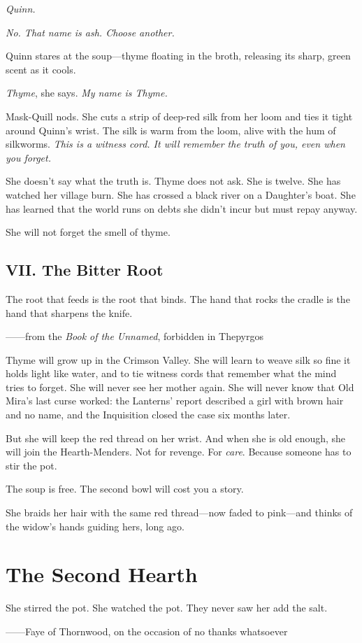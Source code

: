 \documentclass[11pt]{book}
\begin{document}
\textit{Quinn.}

\textit{No. That name is ash. Choose another.}

Quinn stares at the soup---thyme floating in the broth, releasing its sharp, green scent as it cools.

\textit{Thyme}, she says. \textit{My name is Thyme.}

Mask-Quill nods. She cuts a strip of deep-red silk from her loom and ties it tight around Quinn's wrist. The silk is warm from the loom, alive with the hum of silkworms. \textit{This is a witness cord. It will remember the truth of you, even when you forget.}

She doesn't say what the truth is. Thyme does not ask. She is twelve. She has watched her village burn. She has crossed a black river on a Daughter's boat. She has learned that the world runs on debts she didn't incur but must repay anyway.

She will not forget the smell of thyme.

\section*{VII. The Bitter Root}
\epigraph{The root that feeds is the root that binds. The hand that rocks the cradle is the hand that sharpens the knife.}{------from the \textit{Book of the Unnamed}, forbidden in Thepyrgos}

Thyme will grow up in the Crimson Valley. She will learn to weave silk so fine it holds light like water, and to tie witness cords that remember what the mind tries to forget. She will never see her mother again. She will never know that Old Mira's last curse worked: the Lanterns' report described a girl with brown hair and no name, and the Inquisition closed the case six months later.

But she will keep the red thread on her wrist. And when she is old enough, she will join the Hearth-Menders. Not for revenge. For \textit{care}. Because someone has to stir the pot.

The soup is free. The second bowl will cost you a story.

She braids her hair with the same red thread---now faded to pink---and thinks of the widow's hands guiding hers, long ago.

\chapter*{The Second Hearth}
\epigraph{She stirred the pot. She watched the pot. They never saw her add the salt.}{------Faye of Thornwood, on the occasion of no thanks whatsoever}
\end{document}
